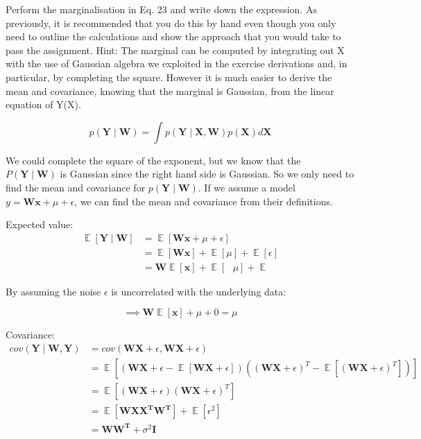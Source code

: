 \documentclass[12pt]{article}
\newenvironment{question}[2][Question]{\begin{trivlist}
\kern10pt
\item[\hskip \labelsep {\bfseries #1}\hskip \labelsep {\bfseries #2.}]}{\end{trivlist}}
\newcommand*{\answer}{%
  \par
  \kern1pt
  \begingroup
    \centering
    \raisebox{.2\baselineskip}{%
      \textcolor{gray}{
	    \rule{.6667\linewidth}{.1pt}%
      }
    }%
    \par
  \kern8pt
  \endgroup
}
\begin{document}
\begin{question}{17}
Perform the marginalisation in Eq. 23 and write down the expression. As previously, it is recommended that you do this by hand even though you only need to outline the calculations and show the approach that you would take to pass the assignment.
Hint: The marginal can be computed by integrating out X with the use of Gaussian algebra we exploited in the exercise derivations and, in particular, by completing the square. However it is much easier to derive the mean and covariance, knowing that the marginal is Gaussian, from the linear equation of Y(X).

\answer

$$p(\boldsymbol{Y} \mid \boldsymbol{W}) = \int p(\boldsymbol{Y} \mid \boldsymbol{X,W})p(\boldsymbol{X})d\boldsymbol{X}$$

We could complete the square of the exponent, but we know that the $P(\boldsymbol{Y} \mid \boldsymbol{W})$ is Gaussian since the right hand side is Gaussian. So we only need to find the mean and covariance for $p(\boldsymbol{Y} \mid \boldsymbol{W})$. If we assume a model $y = \boldsymbol{Wx} + \mu + \epsilon$, we can find the mean and covariance from their definitions.

Expected value:
\begin{equation}
\begin{split}
\mathop{\mathbb{E}}[\boldsymbol{Y} \mid \boldsymbol{W}] &= \mathop{\mathbb{E}}[\boldsymbol{Wx} + \mu + \epsilon]
\\
&= \mathop{\mathbb{E}}[\boldsymbol{Wx}] + \mathop{\mathbb{E}}[\mu] + \mathop{\mathbb{E}}[\epsilon] 
\\
&= \boldsymbol{W}\mathop{\mathbb{E}}[\boldsymbol{x}] + \mathop{\mathbb{E}}[\textbf{	}\mu] + \mathop{\mathbb{E}[\epsilon]}
\end{split}
\end{equation}

By assuming the noise $\epsilon$ is uncorrelated with the underlying data:

\begin{equation}
\implies \boldsymbol{W}\mathop{\mathbb{E}}[\boldsymbol{x}] + \mu + 0 = \mu
\end{equation}

Covariance:
\begin{equation}
\begin{split}
cov(\boldsymbol{Y} \mid \boldsymbol{W, Y})
&= cov(\boldsymbol{WX} + \epsilon, \boldsymbol{WX} + \epsilon)\\
&= \mathop{\mathbb{E}}[(\boldsymbol{WX} + \epsilon - \mathop{\mathbb{E}}[\boldsymbol{WX} + \epsilon])((\boldsymbol{WX} + \epsilon)^T - \mathop{\mathbb{E}}[(\boldsymbol{WX} + \epsilon)^T])]\\
&= \mathop{\mathbb{E}}[(\boldsymbol{WX} + \epsilon)(\boldsymbol{WX} + \epsilon)^T]\\
&= \mathop{\mathbb{E}}[\boldsymbol{WXX^TW^T}] + \mathop{\mathbb{E}}[\epsilon^2]\\
&=\boldsymbol{WW^T} + \sigma^2\boldsymbol{I}
\end{split}
\end{equation}


\end{question}
\end{document}
